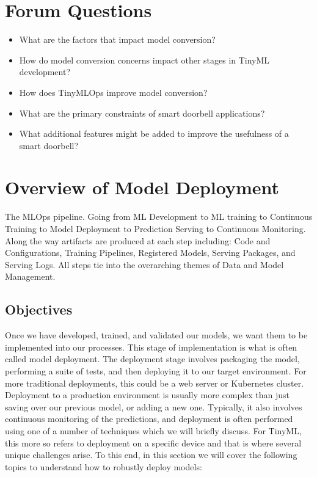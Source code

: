 {{{{{\section{Forum Questions}

\begin{itemize}
  \item What are the factors that impact model conversion? 
  \item   How do model conversion concerns impact other stages in TinyML development?
  \item   How does TinyMLOps improve model conversion?
  \item   What are the primary constraints of smart doorbell applications? 
  \item   What additional features might be added to improve the usefulness of a smart doorbell?
\end{itemize}



\section{Overview of Model Deployment}


    The MLOps pipeline. Going from ML Development to ML training to Continuous Training to Model Deployment to Prediction Serving to Continuous Monitoring. Along the way artifacts are produced at each step including: Code and Configurations, Training Pipelines, Registered Models, Serving Packages, and Serving Logs. All steps tie into the overarching themes of Data and Model Management.
    
    \subsection{Objectives}
    
    Once we have developed, trained, and validated our models, we want them to be implemented into our processes. This stage of implementation is what is often called model deployment. The deployment stage involves packaging the model, performing a suite of tests, and then deploying it to our target environment. For more traditional deployments, this could be a web server or Kubernetes cluster. Deployment to a production environment is usually more complex than just saving over our previous model, or adding a new one. Typically, it also involves continuous monitoring of the predictions, and deployment is often performed using one of a number of techniques which we will briefly discuss. For TinyML, this more so refers to deployment on a specific device and that is where several unique challenges arise. To this end, in this section we will cover the following topics to understand how to robustly deploy models:
    
}}}}}
